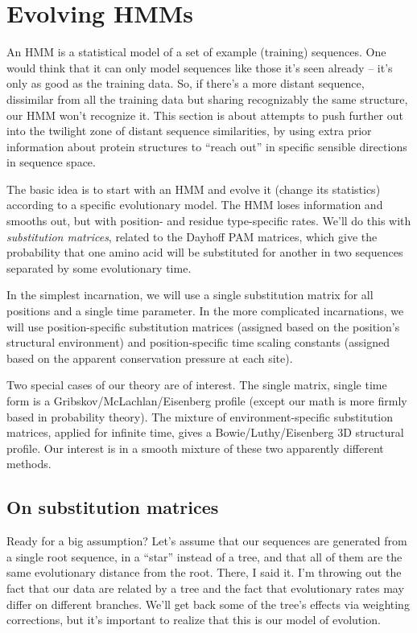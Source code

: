 

\section {Evolving HMMs}

An HMM is a statistical model of a set of example (training)
sequences. One would think that it can only model sequences like those
it's seen already -- it's only as good as the training data.  So, if
there's a more distant sequence, dissimilar from all the training data
but sharing recognizably the same structure, our HMM won't recognize
it. This section is about attempts to push further out into the
twilight zone of distant sequence similarities, by using extra prior
information about protein structures to ``reach out'' in specific
sensible directions in sequence space.

The basic idea is to start with an HMM and evolve it (change its
statistics) according to a specific evolutionary model. The HMM loses
information and smooths out, but with position- and residue
type-specific rates. We'll do this with {\em substitution matrices},
related to the Dayhoff PAM matrices, which give the probability that
one amino acid will be substituted for another in two sequences
separated by some evolutionary time. 

In the simplest incarnation, we will use a single substitution matrix
for all positions and a single time parameter.  In the more
complicated incarnations, we will use position-specific substitution
matrices (assigned based on the position's structural environment) and
position-specific time scaling constants (assigned based on the
apparent conservation pressure at each site).

Two special cases of our theory are of interest.  The single matrix,
single time form is a Gribskov/McLachlan/Eisenberg profile (except our
math is more firmly based in probability theory). The mixture of
environment-specific substitution matrices, applied for infinite time,
gives a Bowie/Luthy/Eisenberg 3D structural profile. Our interest is
in a smooth mixture of these two apparently different methods.

\subsection {On substitution matrices}

Ready for a big assumption? Let's assume that our sequences are
generated from a single root sequence, in a ``star'' instead of a
tree, and that all of them are the same evolutionary distance from the
root. There, I said it. I'm throwing out the fact that our data are
related by a tree and the fact that evolutionary rates may differ on
different branches. We'll get back some of the tree's effects via
weighting corrections, but it's important to realize that this is our
model of evolution.

